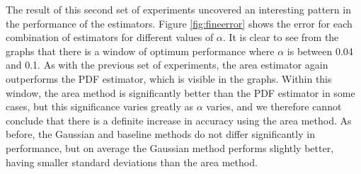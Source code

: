\documentclass[a4paper,11pt]{article}
\begin{document}
    The result of this second set of experiments uncovered an interesting pattern in
    the performance of the estimators. Figure \ref{fig:fineerror} shows the error
    for each combination of estimators for different values of $\alpha$. It is clear
    to see from the graphs that there is a window of optimum performance where
    $\alpha$ is between 0.04 and 0.1. As with the previous set of experiments, the
    area estimator again outperforms the PDF estimator, which is visible in the
    graphs. Within this window, the area method is significantly better than the PDF
    estimator in some cases, but this significance varies greatly as $\alpha$
    varies, and we therefore cannot conclude that there is a definite increase in
    accuracy using the area method. As before, the Gaussian and baseline methods do
    not differ significantly in performance, but on average the Gaussian method
    performs slightly better, having smaller standard deviations than the area
    method.
\end{document}
